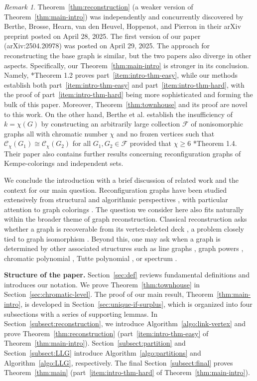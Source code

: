 \documentclass{amsart}
\theoremstyle{hypothesisstyle}
\theoremstyle{definition}
\theoremstyle{remark}
\newtheorem{remark}[theorem]{Remark}
\numberwithin{equation}{section}
\begin{document}
\begin{remark}
Theorem~\ref{thm:reconstruction} (a weaker version of Theorem~\ref{thm:main-intro}) was independently and concurrently discovered by Berthe, Brosse, Hearn, van den Heuvel, Hoppenot, and Pierron \cite{BBHvdHHP25} in their arXiv preprint posted on April 28, 2025. The first version of our paper (arXiv:2504.20978) was posted on April 29, 2025. The approach for reconstructing the base graph is similar, but the two papers also diverge in other aspects. Specifically, our Theorem~\ref{thm:main-intro} is stronger in its conclusion. Namely, \cite{BBHvdHHP25}*{Theorem 1.2} proves part~\eqref{item:intro-thm-easy}, while our methods establish both part~\eqref{item:intro-thm-easy} and part~\eqref{item:intro-thm-hard}, 
with the proof of part~\eqref{item:intro-thm-hard} being more sophisticated and forming the bulk of this paper. Moreover, Theorem~\ref{thm:townhouse} and its proof are novel to this work. On the other hand, Berthe et al. establish the insufficiency of $k=\chi(G)$ by constructing an arbitrarily large collection $\mathcal{F}$ of nonisomorphic graphs all with chromatic number $\chi$ and no frozen vertices such that $\mathcal{C}_{\chi}(G_1)\cong \mathcal{C}_{\chi}(G_2)$ for all $G_1, G_2\in \mathcal{F}$ provided that $\chi\geq 6$ \cite{BBHvdHHP25}*{Theorem 1.4}. Their paper also contains further results concerning reconfiguration graphs of Kempe-colorings and independent sets. \end{remark}

We conclude the introduction with a brief discussion of related work and the context for our main question. Reconfiguration graphs have been studied extensively from structural and algorithmic perspectives \cites{vdH13,Nis18}, with particular attention to graph colorings \cites{CVJ08, BC09, BFHRS16, BB18}. The question we consider here also fits naturally within the broader theme of graph reconstruction. Classical reconstruction asks whether a graph is recoverable from its vertex-deleted deck \cite{LS16}, a problem closely tied to graph isomorphism \cite{HHRT07}. Beyond this, one may ask when a graph is determined by other associated structures such as line graphs \cite{Whi32-line-graphs}, graph powers \cite{RH60}, chromatic polynomial \cites{KT90,KT97}, Tutte polynomial \cite{dMN04}, or spectrum \cite{vDH03}.

\textbf{Structure of the paper.} Section~\ref{sec:def} reviews fundamental definitions and introduces our notation. We prove Theorem~\ref{thm:townhouse} in Section~\ref{sec:chromatic-level}. The proof of our main result, Theorem~\ref{thm:main-intro}, is developed in Section~\ref{sec:unique-if-surplus}, which is organized into four subsections with a series of supporting lemmas. In Section~\ref{subsect:reconstruction}, we introduce Algorithm~\ref{algo:link-vertex} and prove Theorem~\ref{thm:reconstruction} (part~\eqref{item:intro-thm-easy} of Theorem~\ref{thm:main-intro}). Section~\ref{subsect:partition} and Section~\ref{subsect:LLG} introduce Algorithm~\ref{algo:partitions} and Algorithm~\ref{algo:LLG}, respectively. The final Section~\ref{subsect:final} proves Theorem~\ref{thm:main} (part~\eqref{item:intro-thm-hard} of Theorem~\ref{thm:main-intro}). 
\end{document}
